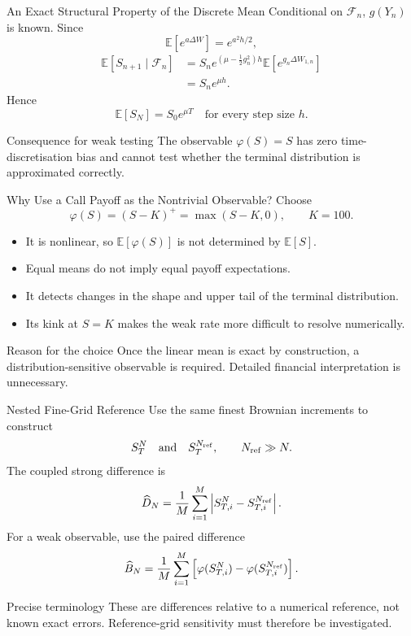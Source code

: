 \documentclass[aspectratio=169,10pt]{beamer}
\newcommand{\E}{\mathbb{E}}
\begin{document}
\begin{frame}{An Exact Structural Property of the Discrete Mean}
  Conditional on $\mathcal F_n$, $g(Y_n)$ is known. Since
  \[
    \E[e^{a\Delta W}]=e^{a^2h/2},
  \]
  \begin{align*}
    \E[S_{n+1}\mid\mathcal F_n]
      &=S_ne^{(\mu-\frac12g_n^2)h}\E[e^{g_n\Delta W_{1,n}}]\\
      &=S_ne^{\mu h}.
  \end{align*}
  Hence
  \[
    \boxed{\E[S_N]=S_0e^{\mu T}\quad\text{for every step size }h.}
  \]
  \begin{alertblock}{Consequence for weak testing}
    The observable $\varphi(S)=S$ has zero time-discretisation bias and cannot
    test whether the terminal distribution is approximated correctly.
  \end{alertblock}
\end{frame}

\begin{frame}{Why Use a Call Payoff as the Nontrivial Observable?}
  Choose
  \[
    \varphi(S)=(S-K)^+=\max(S-K,0),\qquad K=100.
  \]
  \begin{itemize}
    \item It is nonlinear, so $\E[\varphi(S)]$ is not determined by $\E[S]$.
    \item Equal means do not imply equal payoff expectations.
    \item It detects changes in the shape and upper tail of the terminal distribution.
    \item Its kink at $S=K$ makes the weak rate more difficult to resolve numerically.
  \end{itemize}
  \begin{block}{Reason for the choice}
    Once the linear mean is exact by construction, a distribution-sensitive
    observable is required. Detailed financial interpretation is unnecessary.
  \end{block}
\end{frame}

\begin{frame}{Nested Fine-Grid Reference}
  Use the same finest Brownian increments to construct
  \[
    S_T^{N}\quad\text{and}\quad S_T^{N_{\rm ref}},
    \qquad N_{\rm ref}\gg N.
  \]
  The coupled strong difference is
  \[
    \widehat D_N=\frac1M\sum_{i=1}^M
      \left|S_{T,i}^{N}-S_{T,i}^{N_{\rm ref}}\right|.
  \]
  For a weak observable, use the paired difference
  \[
    \widehat B_N=\frac1M\sum_{i=1}^M
      \left[\varphi(S_{T,i}^{N})-\varphi(S_{T,i}^{N_{\rm ref}})\right].
  \]
  \begin{alertblock}{Precise terminology}
    These are differences relative to a numerical reference, not known exact errors.
    Reference-grid sensitivity must therefore be investigated.
  \end{alertblock}
\end{frame}
\end{document}
